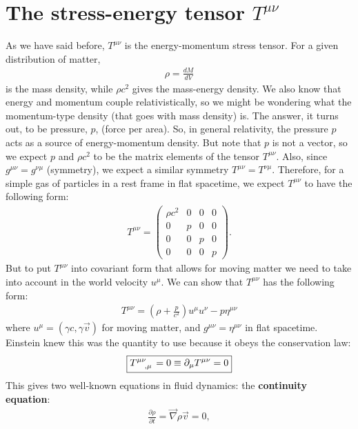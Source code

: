 \documentclass{book}
\theoremstyle{definition}
\begin{document}
\section{The stress-energy tensor $T^{\mu\nu}$}
As we have said before, $T^{\mu\nu}$ is the energy-momentum stress tensor. For a given distribution of matter,
\begin{align*}
\rho = \frac{dM}{dV}
\end{align*}
is the mass density, while $\rho c^2$ gives the mass-energy density. We also know that energy and momentum couple relativistically, so we might be wondering what the momentum-type density (that goes with mass density) is. The answer, it turns out, to be pressure, $p$, (force per area). So, in general relativity, the pressure $p$ acts as a source of energy-momentum density. But note that $p$ is not a vector, so we expect $p$ and $\rho c^2$ to be the matrix elements of the tensor $T^{\mu\nu}$. Also, since $g^{\mu\nu} = g^{\nu\mu}$ (symmetry), we expect a similar symmetry $T^{\mu\nu} = T^{\nu\mu}$. Therefore, for a simple gas of particles in a rest frame in flat spacetime, we expect $T^{\mu\nu}$ to have the following form:
\begin{align*}
T^{\mu\nu} = \begin{pmatrix}
\rho c^2 & 0 & 0 & 0\\
0 & p & 0 & 0\\
0 & 0 & p & 0\\
0 & 0 & 0 & p
\end{pmatrix}.
\end{align*}
But to put $T^{\mu\nu}$ into covariant form that allows for moving matter we need to take into account in the world velocity $u^{\mu}$. We can show that $T^{\mu\nu}$ has the following form:
\begin{align*}
\boxed{T^{\mu\nu} = \left( \rho + \frac{p}{c^2}\right)u^\mu u^\nu - p\eta^{\mu\nu}}
\end{align*}
where $u^\mu = (\gamma c, \gamma\vec{v})$ for moving matter, and $g^{\mu\nu} = \eta^{\mu\nu}$ in flat spacetime. Einstein knew this was the quantity to use because it obeys the conservation law:
\begin{align*}
\boxed{\tensor{T}{^{\mu\nu}_{,\mu}} = 0 \equiv \partial_\mu T^{\mu\nu} = 0}
\end{align*}
This gives two well-known equations in fluid dynamics: the \textbf{continuity equation}:
\begin{align*}
\frac{\partial \rho}{\partial t } = \vec{\nabla}\rho\vec{v} = 0,
\end{align*}
\end{document}
